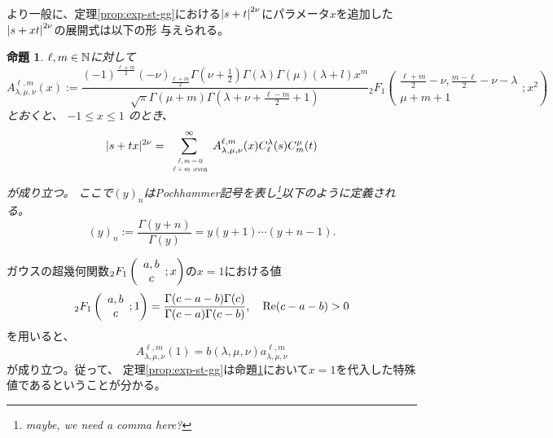 \documentclass[12pt,a4paper,dvipdfmx]{jsarticle}
\numberwithin{equation}{section}
\newcommand{\tmop}[1]{\ensuremath{\operatorname{#1}}}
\newcommand{\assign}{:=}
\theoremstyle{jplain}
\newtheorem{prop}[thm]{命題}
\theoremstyle{remark}
\theoremstyle{definition}
\newcommand{\doubt}[1]{\fbox{#1}}
\begin{document}
	より一般に、定理\ref{prop:exp-st-gg}における$\left|s+t\right|^{2\nu}$にパラメータ$x$を追加した$\left|s+xt\right|^{2\nu}$の展開式は以下の形
	\doubt{で}与えられる。
	\begin{prop}\label{prop:exp-stz-gg}
		$\ell,m\in\mathbb{N}$に対して
		    \begin{equation*}
			    A^{\ell,m}_{\lambda,\mu,\nu} (x) \assign
			    \frac{(-1)^{\frac{\ell+m}{2}}(-\nu)_{\frac{\ell+m}{2}}\Gamma \left( \nu + \frac{1}{2} \right) \Gamma
				  (\lambda) \Gamma (\mu) (\lambda + l) x^m }{\sqrt{\pi} \Gamma
				      (\mu + m) \Gamma \left( \lambda + \nu + \frac{\ell - m}{2} + 1 \right)}
				    {}_2 F_1 \left( \begin{array}{c}
				\frac{\ell + m}{2} - \nu, \frac{m - \ell}{2} - \nu - \lambda\\
				\mu + m + 1
			\end{array} ; x^2 \right)
		\end{equation*}
		とおくと、
		    $-1 \leqslant x \leqslant 1$ のとき、
		\begin{equation*}
			       | s + t x |^{2 \nu}  = \sum_{\scalebox{0.6}{
			      $\begin{array}[]{c}
				  \ell,m=0\\\ell+ m\mbox{ :even}
				\end{array}
			$}}^{\infty} A^{\ell,m}_{\lambda,\mu,\nu}
				 (x) C_\ell^{\lambda} (s) C_m^{\mu} (t)
		    \end{equation*}
		    が成り立つ。
		    ここで$(y)_n$はPochhammer記号を表し\footnote{maybe, we need a comma here?}以下のように定義される。\begin{equation*}
		(y)_n:=\frac{\Gamma(y+n)}{\Gamma(y)}=y(y+1)\cdots(y+n-1).
	\end{equation*}
    \end{prop}
    ガウスの超幾何関数$_2F_1\left(\begin{array}[]{c}
	    a,b\\c
    \end{array};x\right)$の$x=1$における値
\begin{equation*}
		{}_2F_1\left( \begin{array}[]{c}
			a,b\\c
		\end{array};1\right)=\frac{\Gamma(c-a-b)\Gamma(c)}{\Gamma(c-a)\Gamma(c-b)},\quad \Re(c-a-b)>0
	\end{equation*}
	を用いると、\begin{equation*}
		A^{\ell,m}_{\lambda,\mu,\nu}(1)=b(\lambda,\mu,\nu)a^{
		\ell,m}_{\lambda,\mu,\nu}
	\end{equation*}が成り立つ。従って、
	定理\ref{prop:exp-st-gg}は命題\ref{prop:exp-stz-gg}において$x=1$を代入した特{殊}
	値であるということが分かる。
\end{document}
